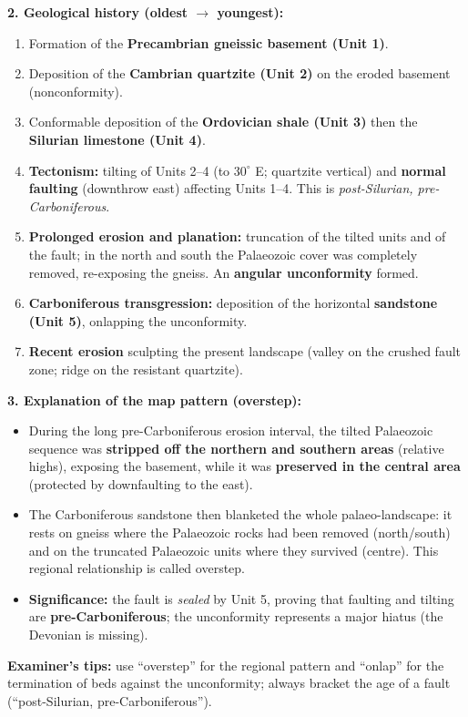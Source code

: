\documentclass[11pt]{article}
\newcommand{\cle}[1]{{\popxbold\color{popdark}#1}}
\begin{document}
\begin{exoresolu}
\textbf{2. Geological history (oldest $\rightarrow$ youngest):}
\begin{enumerate}
    \item Formation of the \textbf{Precambrian gneissic basement (Unit 1)}.
    \item Deposition of the \textbf{Cambrian quartzite (Unit 2)} on the eroded basement (nonconformity).
    \item Conformable deposition of the \textbf{Ordovician shale (Unit 3)} then the \textbf{Silurian limestone (Unit 4)}.
    \item \textbf{Tectonism:} tilting of Units 2--4 (to $30^\circ$ E; quartzite vertical) and \textbf{normal faulting} (downthrow east) affecting Units 1--4. This is \emph{post-Silurian, pre-Carboniferous}.
    \item \textbf{Prolonged erosion and planation:} truncation of the tilted units and of the fault; in the north and south the Palaeozoic cover was completely removed, re-exposing the gneiss. An \textbf{angular unconformity} formed.
    \item \textbf{Carboniferous transgression:} deposition of the horizontal \textbf{sandstone (Unit 5)}, onlapping the unconformity.
    \item \textbf{Recent erosion} sculpting the present landscape (valley on the crushed fault zone; ridge on the resistant quartzite).
\end{enumerate}

\textbf{3. Explanation of the map pattern (overstep):}
\begin{itemize}
    \item During the long pre-Carboniferous erosion interval, the tilted Palaeozoic sequence was \textbf{stripped off the northern and southern areas} (relative highs), exposing the basement, while it was \textbf{preserved in the central area} (protected by downfaulting to the east).
    \item The Carboniferous sandstone then blanketed the whole palaeo-landscape: it rests on gneiss where the Palaeozoic rocks had been removed (north/south) and on the truncated Palaeozoic units where they survived (centre). This regional relationship is called \cle{overstep}.
    \item \textbf{Significance:} the fault is \emph{sealed} by Unit 5, proving that faulting and tilting are \textbf{pre-Carboniferous}; the unconformity represents a major hiatus (the Devonian is missing).
\end{itemize}

\textbf{Examiner's tips:} use ``overstep'' for the regional pattern and ``onlap'' for the termination of beds against the unconformity; always bracket the age of a fault (``post-Silurian, pre-Carboniferous'').
\end{exoresolu}
\end{document}
